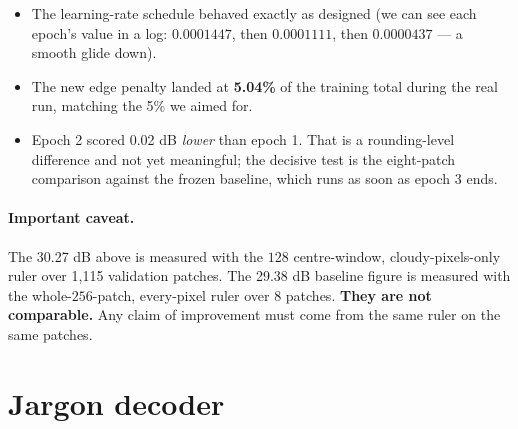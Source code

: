 \documentclass[11pt,a4paper]{article}
\begin{document}
\begin{itemize}
\item The learning-rate schedule behaved exactly as designed (we can see each epoch's value in a
      log: $0.0001447$, then $0.0001111$, then $0.0000437$ --- a smooth glide down).
\item The new edge penalty landed at \textbf{5.04\%} of the training total during the real run,
      matching the 5\% we aimed for.
\item Epoch 2 scored 0.02 dB \emph{lower} than epoch 1. That is a rounding-level difference and not
      yet meaningful; the decisive test is the eight-patch comparison against the frozen baseline,
      which runs as soon as epoch 3 ends.
\end{itemize}

\paragraph{Important caveat.} The 30.27 dB above is measured with the $128$ centre-window,
cloudy-pixels-only ruler over 1{,}115 validation patches. The 29.38 dB baseline figure is measured
with the whole-$256$-patch, every-pixel ruler over 8 patches. \textbf{They are not comparable.} Any
claim of improvement must come from the same ruler on the same patches.

\section{Jargon decoder}
\end{document}
